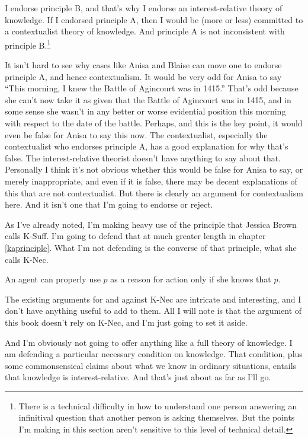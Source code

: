 \documentclass[11pt,]{book}
\providecommand{\tightlist}{%
  \setlength{\itemsep}{0pt}\setlength{\parskip}{0pt}}
\let\rmarkdownfootnote\footnote%
\def\footnote{\protect\rmarkdownfootnote}
\begin{document}
I endorse principle B, and that's why I endorse an interest-relative theory of knowledge. If I endorsed principle A, then I would be (more or less) committed to a contextualist theory of knowledge. And principle A is not inconsistent with principle B.\footnote{There is a technical difficulty in how to understand one person answering an infinitival question that another person is asking themselves. But the points I'm making in this section aren't sensitive to this level of technical detail.}

It isn't hard to see why cases like Anisa and Blaise can move one to endorse principle A, and hence contextualism. It would be very odd for Anisa to say ``This morning, I knew the Battle of Agincourt was in 1415.'' That's odd because she can't now take it as given that the Battle of Agincourt was in 1415, and in some sense she wasn't in any better or worse evidential position this morning with respect to the date of the battle. Perhaps, and this is the key point, it would even be false for Anisa to say this now. The contextualist, especially the contextualist who endorses principle A, has a good explanation for why that's false. The interest-relative theorist doesn't have anything to say about that. Personally I think it's not obvious whether this would be false for Anisa to say, or merely inappropriate, and even if it is false, there may be decent explanations of this that are not contextualist. But there is clearly an argument for contextualism here. And it isn't one that I'm going to endorse or reject.

As I've already noted, I'm making heavy use of the principle that Jessica Brown calls K-Suff. I'm going to defend that at much greater length in chapter \ref{kaprinciple}. What I'm not defending is the converse of that principle, what she calls K-Nec.

\begin{description}
\tightlist
\item[K-Nec]
An agent can properly use \(p\) as a reason for action only if she knows that \(p\).
\end{description}

The existing arguments for and against K-Nec are intricate and interesting, and I don't have anything useful to add to them. All I will note is that the argument of this book doesn't rely on K-Nec, and I'm just going to set it aside.

And I'm obviously not going to offer anything like a full theory of knowledge. I am defending a particular necessary condition on knowledge. That condition, plus some commonsensical claims about what we know in ordinary situations, entails that knowledge is interest-relative. And that's just about as far as I'll go.
\end{document}
